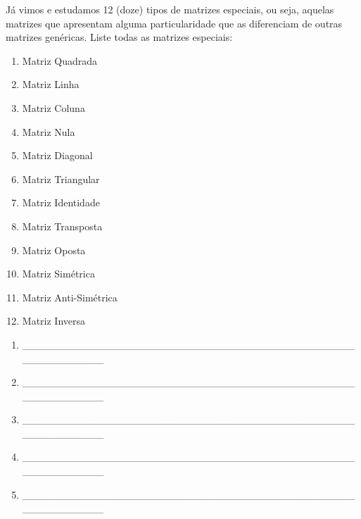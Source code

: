 \documentclass[pdftex, brazil, 12pt, oneside, addpoints]{exam}
\begin{document}
\begin{questions}
    
\question
Já vimos e estudamos 12 (doze) tipos de matrizes especiais, ou seja, aquelas matrizes
que apresentam alguma particularidade que as diferenciam de outras matrizes genéricas.
Liste todas as matrizes especiais:
\ifprintanswers
\begin{solution}
  \vspace{-0.7cm}
\begin{enumerate}
  \item Matriz Quadrada
  \item Matriz Linha
  \item Matriz Coluna
  \item Matriz Nula
  \item Matriz Diagonal
  \item Matriz Triangular
  \item Matriz Identidade
  \item Matriz Transposta
  \item Matriz Oposta
  \item Matriz Simétrica
  \item Matriz Anti-Simétrica
  \item Matriz Inversa
\end{enumerate}
\end{solution}
\else
\begin{enumerate}
  \item \_\_\_\_\_\_\_\_\_\_\_\_\_\_\_\_\_\_\_\_\_\_\_\_\_\_\_\_\_\_\_\_\_\_\_\_\_\_\_\_\_\_\_\_\_\_\_\_\_\_\_\_\_\_\_\_
  \item \_\_\_\_\_\_\_\_\_\_\_\_\_\_\_\_\_\_\_\_\_\_\_\_\_\_\_\_\_\_\_\_\_\_\_\_\_\_\_\_\_\_\_\_\_\_\_\_\_\_\_\_\_\_\_\_
  \item \_\_\_\_\_\_\_\_\_\_\_\_\_\_\_\_\_\_\_\_\_\_\_\_\_\_\_\_\_\_\_\_\_\_\_\_\_\_\_\_\_\_\_\_\_\_\_\_\_\_\_\_\_\_\_\_
  \item \_\_\_\_\_\_\_\_\_\_\_\_\_\_\_\_\_\_\_\_\_\_\_\_\_\_\_\_\_\_\_\_\_\_\_\_\_\_\_\_\_\_\_\_\_\_\_\_\_\_\_\_\_\_\_\_
  \item \_\_\_\_\_\_\_\_\_\_\_\_\_\_\_\_\_\_\_\_\_\_\_\_\_\_\_\_\_\_\_\_\_\_\_\_\_\_\_\_\_\_\_\_\_\_\_\_\_\_\_\_\_\_\_\_

\end{enumerate}
\end{questions}
\end{document}
